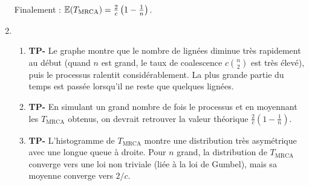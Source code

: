 \documentclass[]{exercices}
\begin{document}
\begin{solution}
\begin{enumerate}
    Finalement : $\mathbb{E}(T_\mathrm{MRCA}) = \frac{2}{c}\left(1 - \frac{1}{n}\right)$.
    \item
    \begin{enumerate}
        \item \textbf{TP-} Le graphe montre que le nombre de lignées diminue très rapidement au début (quand $n$ est grand, le taux de coalescence $c\binom{n}{2}$ est très élevé), puis le processus ralentit considérablement. La plus grande partie du temps est passée lorsqu'il ne reste que quelques lignées.
        \item \textbf{TP-} En simulant un grand nombre de fois le processus et en moyennant les $T_\mathrm{MRCA}$ obtenus, on devrait retrouver la valeur théorique $\frac{2}{c}(1 - \frac{1}{n})$.
        \item \textbf{TP-} L'histogramme de $T_\mathrm{MRCA}$ montre une distribution très asymétrique avec une longue queue à droite. Pour $n$ grand, la distribution de $T_\mathrm{MRCA}$ converge vers une loi non triviale (liée à la loi de Gumbel), mais sa moyenne converge vers $2/c$.
    \end{enumerate}
\end{enumerate}
\end{solution}
\end{document}

